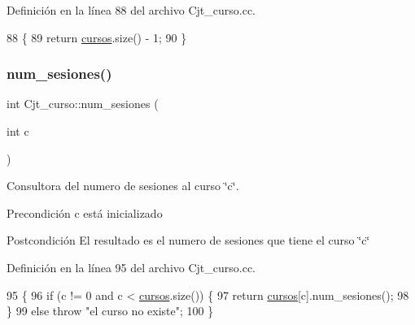 Definición en la línea 88 del archivo Cjt\+\_\+curso.\+cc.


\begin{DoxyCode}
88                           \{
89   \textcolor{keywordflow}{return} \mbox{\hyperlink{class_cjt__curso_af8d4def315cf56b9aab3328bf80bb32c}{cursos}}.size() - 1;
90 \}
\end{DoxyCode}
\mbox{\label{class_cjt__curso_ad20fa025853fba4451e60e9b0cdb4011}} 
\subsubsection{\texorpdfstring{num\+\_\+sesiones()}{num\_sesiones()}}
{\footnotesize\ttfamily int Cjt\+\_\+curso\+::num\+\_\+sesiones (\begin{DoxyParamCaption}\item[{int}]{c }\end{DoxyParamCaption})}



Consultora del numero de sesiones al curso \char`\"{}c\char`\"{}. 

\begin{DoxyPrecond}{Precondición}
c está inicializado 
\end{DoxyPrecond}
\begin{DoxyPostcond}{Postcondición}
El resultado es el numero de sesiones que tiene el curso \char`\"{}c\char`\"{} 
\end{DoxyPostcond}


Definición en la línea 95 del archivo Cjt\+\_\+curso.\+cc.


\begin{DoxyCode}
95                                  \{
96   \textcolor{keywordflow}{if} (c != 0 and c < \mbox{\hyperlink{class_cjt__curso_af8d4def315cf56b9aab3328bf80bb32c}{cursos}}.size()) \{
97     \textcolor{keywordflow}{return} \mbox{\hyperlink{class_cjt__curso_af8d4def315cf56b9aab3328bf80bb32c}{cursos}}[c].num\_sesiones();
98   \}
99   \textcolor{keywordflow}{else} \textcolor{keywordflow}{throw} \textcolor{stringliteral}{"el curso no existe"};
100 \}
\end{DoxyCode}
\mbox{\label{class_cjt__curso_a62fcf92bed669fed99ef01f495570877}} 
